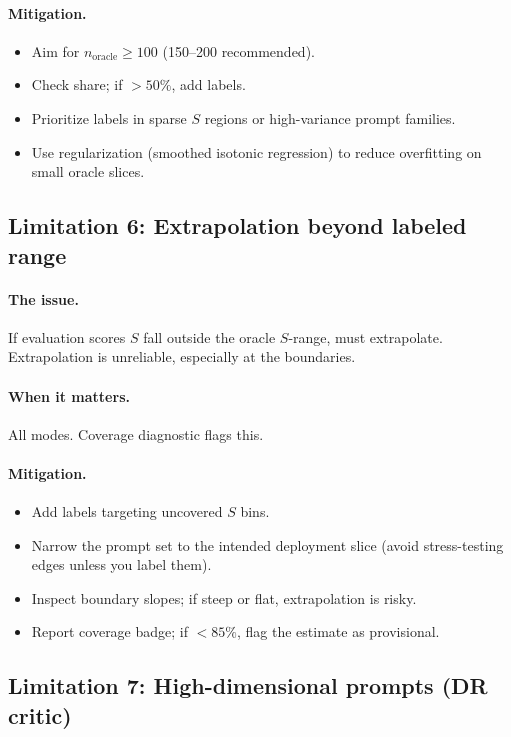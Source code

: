 \paragraph{Mitigation.}
\begin{itemize}
\item Aim for $n_{\text{oracle}} \ge 100$ (150--200 recommended).
\item Check \oua{} share; if $> 50\%$, add labels.
\item Prioritize labels in sparse $S$ regions or high-variance prompt families.
\item Use regularization (smoothed isotonic regression) to reduce overfitting on small oracle slices.
\end{itemize}

\subsection{Limitation 6: Extrapolation beyond labeled range}

\paragraph{The issue.} If evaluation scores $S$ fall outside the oracle $S$-range, \autocal{} must extrapolate. Extrapolation is unreliable, especially at the boundaries.

\paragraph{When it matters.} All modes. Coverage diagnostic flags this.

\paragraph{Mitigation.}
\begin{itemize}
\item Add labels targeting uncovered $S$ bins.
\item Narrow the prompt set to the intended deployment slice (avoid stress-testing edges unless you label them).
\item Inspect boundary slopes; if steep or flat, extrapolation is risky.
\item Report coverage badge; if $< 85\%$, flag the estimate as provisional.
\end{itemize}

\subsection{Limitation 7: High-dimensional prompts (DR critic)}

